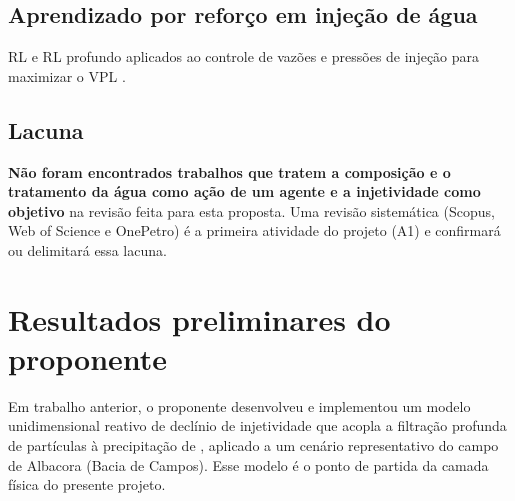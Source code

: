 \documentclass[11pt,a4paper]{article}
\begin{document}
\subsection{Aprendizado por reforço em injeção de água}
RL e RL profundo aplicados ao controle de vazões e pressões de injeção para maximizar o
VPL \cite{miftakhov2020,abdalla2025,nascimento2022}.

\subsection{Lacuna}
\textbf{Não foram encontrados trabalhos que tratem a composição e o tratamento da água
como ação de um agente e a injetividade como objetivo} na revisão feita para esta
proposta. Uma revisão sistemática (Scopus, Web of Science e OnePetro) é a primeira
atividade do projeto (A1) e confirmará ou delimitará essa lacuna.

\section{Resultados preliminares do proponente}\label{sec:prelim}

Em trabalho anterior, o proponente desenvolveu e implementou um modelo unidimensional
reativo de declínio de injetividade que acopla a filtração profunda de partículas à
precipitação de , aplicado a um cenário representativo do campo de Albacora
(Bacia de Campos). Esse modelo é o ponto de partida da camada física do presente projeto.
\end{document}
